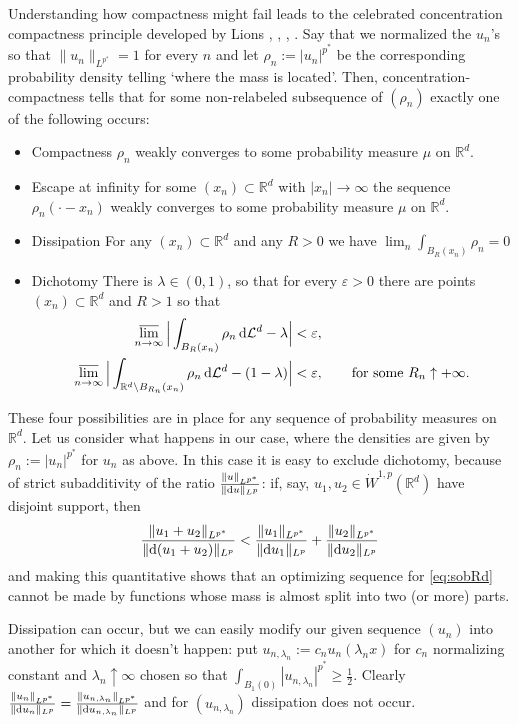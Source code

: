 \documentclass[11pt]{article}
\numberwithin{equation}{section}
\newcommand{\R}{\mathbb{R}}
\renewcommand{\d}{{\rm d}}
\newcommand{\lims}{\varlimsup}
\newcommand{\eps}{\varepsilon}
\begin{document}
Understanding how compactness might fail leads to the celebrated concentration compactness principle developed by Lions \cite{LionsLimCasI}, \cite{LionsLimCasII}, \cite{LionsLocComI}, \cite{LionsLocComII}. Say that we normalized the $u_n$'s so that $\|u_n\|_{L^{p^*}}=1$ for every $n$  and let $\rho_n:=|u_n|^{p^*}$ be the corresponding probability density telling `where the mass is located'. Then,  concentration-compactness tells that for some non-relabeled subsequence of $(\rho_n)$ exactly one of the following occurs:
\begin{itemize}
\item[i)] {\sc Compactness} $\rho_n$ weakly converges to some probability measure $\mu$ on $\R^d$.
\item[ii)] {\sc Escape at infinity} for some $(x_n)\subset \R^d$ with $|x_n|\to\infty$ the sequence $\rho_n(\cdot-x_n)$ weakly converges to some probability measure $\mu$ on $\R^d$.
\item[iii)] {\sc Dissipation} For any $(x_n)\subset \R^d$ and any $R>0$ we have $\lim_n\int_{B_R(x_n)}\rho_n= 0$
\item[iv)] {\sc Dichotomy} There is $\lambda\in(0,1)$, so that for every $\eps>0$ there are points $(x_n)\subset\R^d$ and $R>1$ so that
\[
\begin{split}
\lims_{n\to\infty}\Big|\int_{B_R(x_n)}\rho_n\,\d\mathcal L^d-\lambda\Big|&<\eps,\\
\lims_{n\to\infty}\Big|\int_{\R^d\setminus B_{R_n}(x_n)}\rho_n\,\d\mathcal L^d-(1-\lambda)\Big|&<\eps,\qquad\text{for some }R_n\uparrow+\infty.
\end{split}
\]
\end{itemize}
These four possibilities are in place for any sequence of probability measures on $\R^d$. Let us consider what happens in our case,  where the densities are given by $\rho_n:=|u_n|^{p^*}$ for $u_n$ as above. In this case it is easy to exclude dichotomy, because of strict subadditivity  of the ratio $\frac{\|u\|_{L^{p^*}}}{\|\d u\|_{L^p}}$: if, say, $u_1,u_2\in \dot W^{1,p}(\R^d)$ have disjoint support, then 
\begin{equation}
\label{eq:strictconv}
\frac{\|u_1+u_2\|_{L^{p^*}}}{\|\d (u_1+u_2)\|_{L^p}}<\frac{\|u_1\|_{L^{p^*}}}{\|\d u_1\|_{L^p}}+\frac{\|u_2\|_{L^{p^*}}}{\|\d u_2\|_{L^p}}
\end{equation}
and making this quantitative shows that an optimizing sequence for   \eqref{eq:sobRd} cannot be made by functions whose mass is almost split into two (or more) parts.

Dissipation can occur, but we can easily modify our given sequence $(u_n)$ into another for which it doesn't happen: put $u_{n,\lambda_n}:=c_{n} u_n(\lambda_n x)$ for $c_n$ normalizing constant and $\lambda_n\uparrow\infty$ chosen so that $\int_{B_1(0)} |u_{n,\lambda_n}|^{p^*}\geq \tfrac12$. Clearly $\frac{\|u_n\|_{L^{p^*}}}{\|\d u_n\|_{L^p}}=\frac{\|u_{n,\lambda_n}\|_{L^{p^*}}}{\|\d u_{n,\lambda_n}\|_{L^p}}$ and for $(u_{n,\lambda_n})$ dissipation does not occur.
\end{document}
